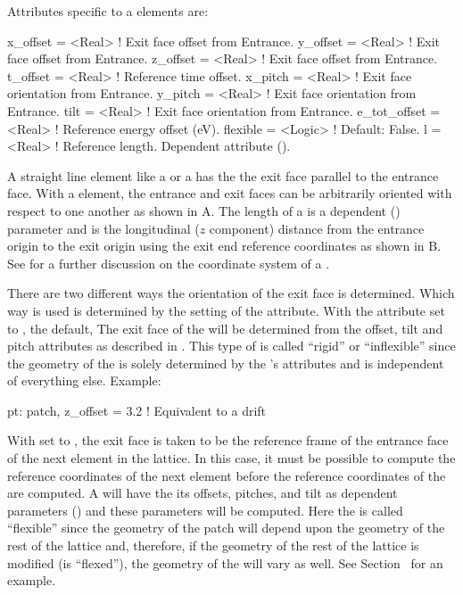 {
Attributes specific to a  elements are:
\begin{example}
  x_offset        = <Real>  ! Exit face offset from Entrance.
  y_offset        = <Real>  ! Exit face offset from Entrance.
  z_offset        = <Real>  ! Exit face offset from Entrance.
  t_offset        = <Real>  ! Reference time offset.
  x_pitch         = <Real>  ! Exit face orientation from Entrance.
  y_pitch         = <Real>  ! Exit face orientation from Entrance.
  tilt            = <Real>  ! Exit face orientation from Entrance.
  e_tot_offset    = <Real>  ! Reference energy offset (eV).
  flexible        = <Logic> ! Default: False.
  l               = <Real>  ! Reference length. Dependent attribute (). 
\end{example}

A straight line element like a  or a  has the
the exit face parallel to the entrance face. With a 
element, the entrance and exit faces can be arbitrarily oriented with
respect to one another as shown in A. The length 
of a  is a dependent () parameter and is the
longitudinal ($z$ component) distance from the entrance origin to the
exit origin using the exit end reference coordinates as shown in
B. See  for a further discussion on
the coordinate system of a .

There are two different ways the orientation of the exit face is
determined. Which way is used is determined by the setting of the
 attribute.  With the  attribute set to
, the default, The exit face of the  will be
determined from the offset, tilt and pitch attributes as described in
. This type of  is called ``rigid'' or
``inflexible'' since the geometry of the  is solely
determined by the 's attributes and is independent of
everything else.  Example:
\begin{example}
  pt: patch, z_offset = 3.2   ! Equivalent to a drift
\end{example}

With  set to , the exit face is taken to be the
reference frame of the entrance face of the next element in the
lattice. In this case, it must be possible to compute the reference
coordinates of the next element before the reference coordinates of
the  are computed. A   will have the
its offsets, pitches, and tilt as dependent parameters
() and these parameters will be computed. Here the
 is called ``flexible'' since the geometry of the patch will
depend upon the geometry of the rest of the lattice and, therefore, if
the geometry of the rest of the lattice is modified (is ``flexed''),
the geometry of the  will vary as well. See
Section~ for an example.

}
